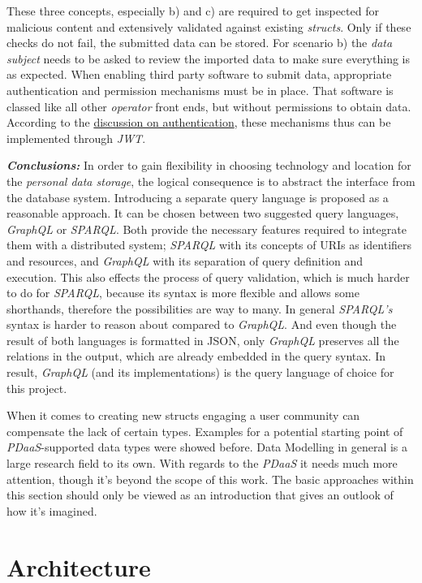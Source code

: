\documentclass[12pt,english,a4paper,titlepage,cleardoublepage=empty,dottedtoc]{report}
\begin{document}
These three concepts, especially b) and c) are required to get inspected
for malicious content and extensively validated against existing
\emph{structs}. Only if these checks do not fail, the submitted data can
be stored. For scenario b) the \emph{data subject} needs to be asked to
review the imported data to make sure everything is as expected. When
enabling third party software to submit data, appropriate authentication
and permission mechanisms must be in place. That software is classed
like all other \emph{operator} front ends, but without permissions to
obtain data. According to the
\protect\hyperlink{authentication}{discussion on authentication}, these
mechanisms thus can be implemented through \emph{JWT}.

\emph{\textbf{Conclusions:}} In order to gain flexibility in choosing
technology and location for the \emph{personal data storage}, the
logical consequence is to abstract the interface from the database
system. Introducing a separate query language is proposed as a
reasonable approach. It can be chosen between two suggested query
languages, \emph{GraphQL} or \emph{SPARQL}. Both provide the necessary
features required to integrate them with a distributed system;
\emph{SPARQL} with its concepts of URIs as identifiers and resources,
and \emph{GraphQL} with its separation of query definition and
execution. This also effects the process of query validation, which is
much harder to do for \emph{SPARQL}, because its syntax is more flexible
and allows some shorthands, therefore the possibilities are way to many.
In general \emph{SPARQL's} syntax is harder to reason about compared to
\emph{GraphQL}. And even though the result of both languages is
formatted in JSON, only \emph{GraphQL} preserves all the relations in
the output, which are already embedded in the query syntax. In result,
\emph{GraphQL} (and its implementations) is the query language of choice
for this project.

When it comes to creating new structs engaging a user community can
compensate the lack of certain types. Examples for a potential starting
point of \emph{PDaaS}-supported data types were showed before. Data
Modelling in general is a large research field to its own. With regards
to the \emph{PDaaS} it needs much more attention, though it's beyond the
scope of this work. The basic approaches within this section should only
be viewed as an introduction that gives an outlook of how it's imagined.

\section{Architecture}\label{architecture}
\end{document}
